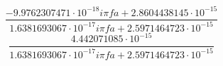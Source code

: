 $$\frac{- 9.9762307471 \cdot 10^{-18} i \pi fa + 2.8604438145 \cdot 10^{-15}}{1.6381693067 \cdot 10^{-17} i \pi fa + 2.5971464723 \cdot 10^{-15}}$$
$$\frac{4.442071085 \cdot 10^{-15}}{1.6381693067 \cdot 10^{-17} i \pi fa + 2.5971464723 \cdot 10^{-15}}$$
